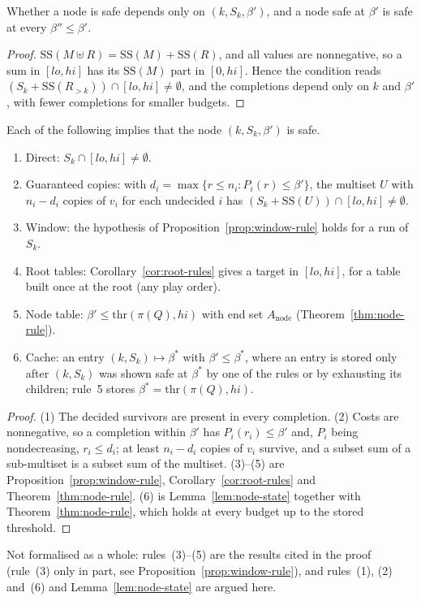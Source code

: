 \begin{lemma}\label{lem:node-state}
Whether a node is safe depends only on $(k,S_k,\beta')$, and a node safe at
$\beta'$ is safe at every $\beta''\le\beta'$.
\end{lemma}
\begin{proof}
$\mathrm{SS}(M\uplus R)=\mathrm{SS}(M)+\mathrm{SS}(R)$, and all values are nonnegative, so a sum in
$[lo,hi]$ has its $\mathrm{SS}(M)$ part in $[0,hi]$. Hence the condition reads
$(S_k+\mathrm{SS}(R_{>k}))\cap[lo,hi]\neq\emptyset$, and the completions depend only on $k$
and $\beta'$, with fewer completions for smaller budgets.
\end{proof}

\begin{theorem}\label{thm:kip-rules}
Each of the following implies that the node $(k,S_k,\beta')$ is safe.
\begin{enumerate}
\item Direct: $S_k\cap[lo,hi]\neq\emptyset$.
\item Guaranteed copies: with $d_i=\max\{r\le n_i: P_i(r)\le\beta'\}$, the
multiset $U$ with $n_i-d_i$ copies of $v_i$ for each undecided $i$ has
$(S_k+\mathrm{SS}(U))\cap[lo,hi]\neq\emptyset$.
\item Window: the hypothesis of Proposition~\ref{prop:window-rule} holds for a
run of $S_k$.
\item Root tables: Corollary~\ref{cor:root-rules} gives a target in $[lo,hi]$,
for a table built once at the root (any play order).
\item Node table: $\beta'\le\mathrm{thr}(\pi(Q),hi)$ with end set $A_{\mathrm{node}}$
(Theorem~\ref{thm:node-rule}).
\item Cache: an entry $(k,S_k)\mapsto\beta^{*}$ with $\beta'\le\beta^{*}$, where an
entry is stored only after $(k,S_k)$ was shown safe at $\beta^{*}$ by one of
the rules or by exhausting its children; rule~5 stores
$\beta^{*}=\mathrm{thr}(\pi(Q),hi)$.
\end{enumerate}
\end{theorem}
\begin{proof}
(1) The decided survivors are present in every completion. (2) Costs are
nonnegative, so a completion within $\beta'$ has $P_i(r_i)\le\beta'$ and, $P_i$
being nondecreasing, $r_i\le d_i$; at least $n_i-d_i$ copies of $v_i$ survive,
and a subset sum of a sub-multiset is a subset sum of the multiset. (3)--(5)
are Proposition~\ref{prop:window-rule}, Corollary~\ref{cor:root-rules} and
Theorem~\ref{thm:node-rule}. (6) is Lemma~\ref{lem:node-state} together with
Theorem~\ref{thm:node-rule}, which holds at every budget up to the stored
threshold.
\end{proof}
\noindent Not formalised as a whole: rules~(3)--(5) are the results cited in
the proof (rule~(3) only in part, see Proposition~\ref{prop:window-rule}), and
rules~(1), (2) and~(6) and Lemma~\ref{lem:node-state} are argued here.

